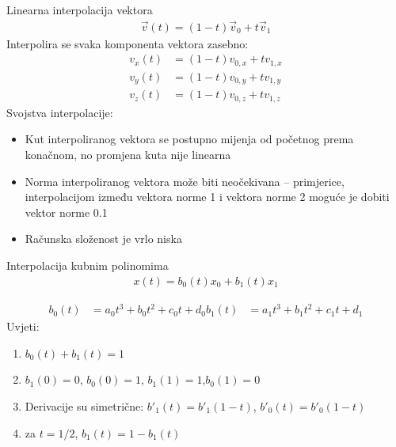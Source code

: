 \documentclass[9pt]{beamer}
\begin{document}
\begin{frame}{Linearna interpolacija vektora}
	\begin{align*}
		\vec{v}(t) = (1-t)\vec{v}_0 + t\vec{v}_1
	\end{align*}
	Interpolira se svaka komponenta vektora zasebno:
	\begin{align*}
		v_x(t) &= (1-t)v_{0,x} + tv_{1,x} \\
		v_y(t) &= (1-t)v_{0,y} + tv_{1,y} \\
		v_z(t) &= (1-t)v_{0,z} + tv_{1,z}
	\end{align*}
	Svojstva interpolacije:
	\begin{itemize}
		\item Kut interpoliranog vektora se postupno mijenja od početnog prema konačnom, no promjena kuta
		nije linearna
		\item Norma interpoliranog vektora može biti neočekivana – primjerice, interpolacijom između vektora
		norme 1 i vektora norme 2 moguće je dobiti vektor norme 0.1
		\item Računska složenost je vrlo niska
	\end{itemize}
\end{frame}
\begin{frame}{Interpolacija kubnim polinomima}
	\begin{align*}
		x(t) = b_0(t) x_0 + b_1(t) x_1
	\end{align*}
	
	\begin{align*}
		b_0(t) &= a_0t^3+b_0t^2+c_0t + d_0
		b_1(t) &= a_1t^3+b_1t^2+c_1t + d_1
	\end{align*}
	Uvjeti:
	\begin{enumerate}
		\item $b_0(t) + b_1(t) = 1$
		\item $b_1(0) = 0$, $b_0(0) = 1$,  $b_1(1) = 1$,$b_0(1) = 0$ 
		\item Derivacije su simetrične: $b'_1(t) = b'_1(1-t)$, $b'_0(t) = b'_0(1-t)$
		\item za $t=1/2$, $b_1(t) = 1-b_1(t)$
	\end{enumerate}
\end{frame}
\end{document}
